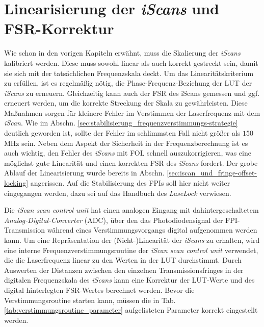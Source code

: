 \section{Linearisierung der \textit{iScans} und
FSR-Korrektur}\label{sec:linearisierung_iscan} Wie schon in den vorigen
Kapiteln erwähnt, muss die Skalierung der \textit{iScans} kalibriert werden.
Diese muss sowohl linear als auch korrekt gestreckt
sein, damit sie sich mit der tatsächlichen Frequenzskala deckt. Um das
Linearitätskriterium zu erfüllen, ist es regelmäßig nötig, die
Phase-Frequenz-Beziehung der LUT der \textit{iScans} zu erneuern. Gleichzeitig
kann auch der FSR des iScans gemessen und ggf. erneuert werden, um die korrekte Streckung der Skala zu gewährleisten.
Diese Maßnahmen sorgen für kleinere Fehler im Verstimmen der Laserfrequenz mit
dem \textit{iScan}. Wie im Abschn.
\ref{sec:stabilisierung_frequenzverstimmungs-strategie} deutlich geworden ist,
sollte der Fehler im schlimmsten Fall nicht größer als $150\,$MHz sein. Neben
dem Aspekt der Sicherheit in der Frequenzberechnung ist es auch wichtig, den
Fehler des \textit{iScans} mit FOL schnell auszukorrigieren, was eine möglichst
gute Linearität und einen korrekten FSR des \textit{iScans} fordert. Der grobe Ablauf
der Linearisierung wurde bereits in Abschn. \ref{sec:iscan_und_fringe-offset-locking} angerissen. Auf die Stabilisierung des FPIs soll hier nicht weiter eingegangen werden, dazu sei auf das Handbuch des \textit{LaseLock} \cite{laselock} verwiesen.\par
Die \textit{iScan scan control unit} hat einen analogen Eingang mit
dahintergeschaltetem \textit{Analog-Digital-Converter} (ADC), über den das
Photodiodensignal der FPI-Transmission während eines
Verstimmungsvorgangs digital aufgenommen werden kann. Um eine Repräsentation der
(Nicht-)Linearität der \textit{iScans} zu erhalten, wird eine interne
Frequenzverstimmungsroutine der \textit{iScan scan control unit} verwendet, die
die Laserfrequenz linear zu den Werten in der LUT durchstimmt.
Durch Auswerten der Distanzen zwischen den einzelnen
Transmissionsfringes in der digitalen Frequenzskala des \textit{iScans} kann
eine Korrektur der LUT-Werte und des digital hinterlegten FSR-Wertes berechnet
werden. Bevor die Verstimmungsroutine starten kann, müssen die in Tab.
\ref{tab:verstimmungsroutine_parameter} aufgelisteten Parameter korrekt
eingestellt werden.
